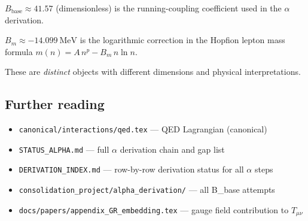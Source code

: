 \documentclass[11pt,a4paper]{article}
\begin{document}
\begin{tcolorbox}[colback=blue!5!white,colframe=blue!40!black,title=Notation note]
$B_\text{base} \approx 41.57$ (dimensionless) is the running-coupling coefficient
used in the $\alpha$ derivation.

$B_m \approx -14.099\ \mathrm{MeV}$ is the logarithmic correction in the Hopfion
lepton mass formula $m(n) = A\,n^p - B_m\,n\ln n$.

These are \emph{distinct} objects with different dimensions and physical interpretations.
\end{tcolorbox}

\subsection{Further reading}

\begin{itemize}
  \item \texttt{canonical/interactions/qed.tex} — QED Lagrangian (canonical)
  \item \texttt{STATUS\_ALPHA.md} — full $\alpha$ derivation chain and gap list
  \item \texttt{DERIVATION\_INDEX.md} — row-by-row derivation status for all $\alpha$ steps
  \item \texttt{consolidation\_project/alpha\_derivation/} — all B\_base attempts
  \item \texttt{docs/papers/appendix\_GR\_embedding.tex} — gauge field contribution to $T_{\mu\nu}$
\end{itemize}

\end{document}
